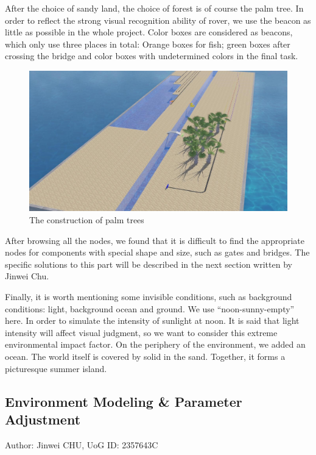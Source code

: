 After the choice of sandy land, the choice of forest is of course the palm tree. In order to reflect the strong visual recognition ability of rover, we use the beacon as little as possible in the whole project. Color boxes are considered as beacons, which only use three places in total: Orange boxes for fish; green boxes after crossing the bridge and color boxes with undetermined colors in the final task.

\begin{figure}[htbp]
    \centering
    \includegraphics[width=12cm]{implementation/img_xiong/environment.jpg}
    \caption{The construction of palm trees}
    \label{fig:environment}
\end{figure}

After browsing all the nodes, we found that it is difficult to find the appropriate nodes for components with special shape and size, such as gates and bridges. The specific solutions to this part will be described in the next section written by Jinwei Chu.

Finally, it is worth mentioning some invisible conditions, such as background conditions: light, background ocean and ground. We use “noon-sunny-empty” here. In order to simulate the intensity of sunlight at noon. It is said that light intensity will affect visual judgment, so we want to consider this extreme environmental impact factor. On the periphery of the environment, we added an ocean. The world itself is covered by solid in the sand. Together, it forms a picturesque summer island.
\subsection{Environment Modeling \& Parameter Adjustment}
Author: Jinwei CHU, UoG ID: 2357643C\\

